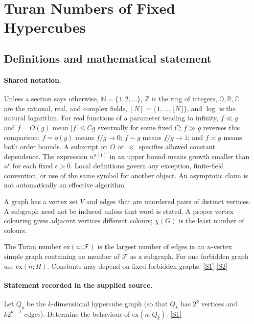 \documentclass[11pt,a4paper]{article}
\newcommand{\N}{\mathbb{N}}
\newcommand{\Z}{\mathbb{Z}}
\newcommand{\Q}{\mathbb{Q}}
\newcommand{\R}{\mathbb{R}}
\newcommand{\C}{\mathbb{C}}
\newcommand{\sref}[2]{\hyperlink{source:#1:#2}{[S#2]}}
\begin{document}
\section{Turan Numbers of Fixed Hypercubes}\label{statement}


\subsection{Definitions and mathematical statement}

\paragraph{Shared notation.}Unless a section says otherwise, $\N=\{1,2,\ldots\}$,
$\Z$ is the ring of integers, $\Q,\R,\C$ are the rational, real, and complex
fields, $[N]=\{1,\ldots,\lfloor N\rfloor\}$, and $\log$ is the natural
logarithm. For real functions of a parameter tending to infinity,
$f\ll g$ and $f=O(g)$ mean $|f|\leq Cg$ eventually for some fixed $C$;
$f\gg g$ reverses this comparison; $f=o(g)$ means $f/g\to0$;
$f\sim g$ means $f/g\to1$; and $f\asymp g$ means both order bounds.
A subscript on $O$ or $\ll$ specifies allowed constant dependence.
The expression $n^{o(1)}$ in an upper bound means growth smaller than
$n^\epsilon$ for each fixed $\epsilon>0$. Local definitions govern any
exception, finite-field convention, or use of the same symbol for another
object. An asymptotic claim is not automatically an effective algorithm.



A graph has a vertex set $V$ and edges that are unordered pairs of distinct vertices. A subgraph need not be induced unless that word is stated. A proper vertex colouring gives adjacent vertices different colours; $\chi(G)$ is the least number of colours.

The Turan number $\mathrm{ex}(n;\mathcal F)$ is the largest number of edges in an $n$-vertex simple graph containing no member of $\mathcal F$ as a subgraph. For one forbidden graph use $\mathrm{ex}(n;H)$. Constants may depend on fixed forbidden graphs. \sref{statement}{1} \sref{statement}{2}

\paragraph{Statement recorded in the supplied source.}
Let $Q_k$ be the $k$-dimensional hypercube graph (so that $Q_k$ has $2^k$ vertices and $k2^{k-1}$ edges). Determine the behaviour of $ \mathrm{ex}(n;Q_k). $ \sref{statement}{1}
\end{document}
